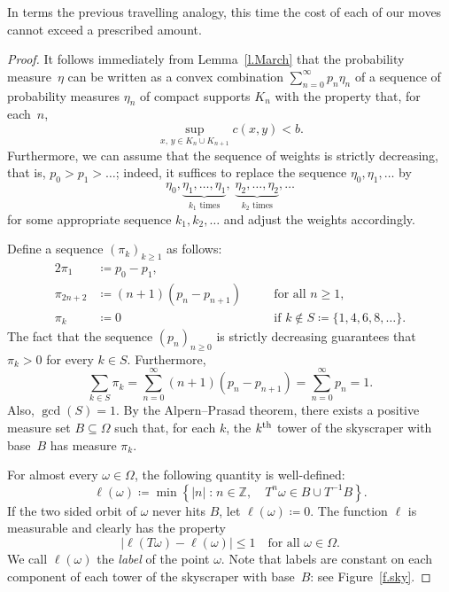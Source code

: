 \documentclass[10pt]{amsart}
\theoremstyle{definition}\newtheorem{defi}[theo]{Definition}\newtheorem{rema}[theo]{Remark}\newtheorem{exam}[theo]{Example}\newtheorem{exem}[theo]{Example}\newtheorem{nota}[theo]{Notation}
\DeclareMathOperator{\gcdd}{gcd}
\newcommand{\Z}{\mathbb{Z}}
\newcommand{\st}{\;\mathord{:}\;}
\begin{document}
In terms the previous travelling analogy, this time the cost of each of our moves cannot exceed a prescribed amount.

\begin{proof}
It follows immediately from Lemma~\ref{l.March} that the probability measure~$\eta$ can be written as a convex combination $\sum_{n=0}^\infty p_n \eta_n$ of a sequence of probability measures $\eta_n$ of compact supports $K_n$ with the property that, for each~$n$,
\begin{equation}\label{e.lunchtime}
\sup_{x, \, y \in K_n \cup K_{n+1}} c(x,y) < b.
\end{equation}
Furthermore, we can assume that the sequence of weights is strictly decreasing, that is, $p_0>p_1>\dots$; indeed, it suffices to replace the sequence $\eta_0,\eta_1,\dots$ by
\begin{equation}
\eta_0,
\underbrace{\eta_1,\dots,\eta_1}_{\text{$k_1$ times}},\; 
\underbrace{\eta_2,\dots,\eta_2}_{\text{$k_2$ times}}, \dots
\end{equation}
for some appropriate sequence $k_1,k_2,\dots$ and adjust the weights accordingly.

Define a sequence $(\pi_k)_{k \ge 1}$ as follows:
\begin{alignat}{2}
\pi_1 &\coloneqq p_0 - p_1, \\
\pi_{2n+2}&\coloneqq (n+1)(p_n-p_{n+1}) &\quad&\text{for all $n \ge 1$,} \\
\pi_k&\coloneqq 0  &\quad&\text{if $k \not\in S \coloneqq \{1,4,6,8,\dots\}$}.
\end{alignat}
The fact that the sequence $(p_n)_{n \ge 0}$ is strictly decreasing guarantees that $\pi_k > 0$ for every $k \in S$. Furthermore,
\begin{equation}
\sum_{k \in S} \pi_k = \sum_{n=0}^\infty (n+1)(p_n-p_{n+1}) = \sum_{n=0}^\infty p_n = 1.
\end{equation}
Also, $\gcdd(S) = 1$. By the Alpern--Prasad theorem, there exists a positive measure set $B \subseteq \Omega$ such that, for each $k$, the $k^{\rm th}$ tower of the skyscraper with base~$B$ has measure $\pi_k$.

For almost every $\omega \in \Omega$, the following quantity is well-defined:
\begin{equation}
\ell(\omega) \coloneqq \min \left\{|n| \st n\in \Z, \quad T^n \omega \in B \cup T^{-1} B \right\}.
\end{equation}
If the two sided orbit of $\omega$ never hits $B$, let $\ell(\omega) \coloneqq 0$. The function $\ell$ is measurable and clearly has the property
\begin{equation}\label{e.at_most_one}
|\ell(T\omega) - \ell(\omega)| \le 1 \quad \text{for all $\omega \in \Omega$.}
\end{equation}
We call $\ell(\omega)$ the \emph{label} of the point $\omega$. Note that labels are constant on each component of each tower of the skyscraper with base~$B$: see Figure~\ref{f.sky}.


\end{proof}
\end{document}
